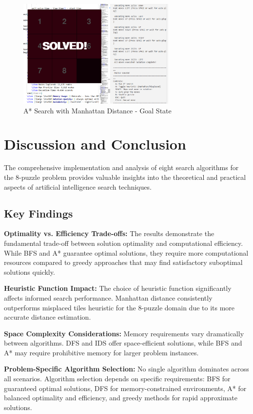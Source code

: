 \documentclass[11pt,a4paper]{article}
\begin{document}
\begin{figure}[H]
\centering
\includegraphics[width=0.7\textwidth]{../searches/astar_8_puzzle/End_state_man.png}
\caption{A* Search with Manhattan Distance - Goal State}
\end{figure}

\section{Discussion and Conclusion}

The comprehensive implementation and analysis of eight search algorithms for the 8-puzzle problem provides valuable insights into the theoretical and practical aspects of artificial intelligence search techniques.

\subsection{Key Findings}

\textbf{Optimality vs. Efficiency Trade-offs:} The results demonstrate the fundamental trade-off between solution optimality and computational efficiency. While BFS and A* guarantee optimal solutions, they require more computational resources compared to greedy approaches that may find satisfactory suboptimal solutions quickly.

\textbf{Heuristic Function Impact:} The choice of heuristic function significantly affects informed search performance. Manhattan distance consistently outperforms misplaced tiles heuristic for the 8-puzzle domain due to its more accurate distance estimation.

\textbf{Space Complexity Considerations:} Memory requirements vary dramatically between algorithms. DFS and IDS offer space-efficient solutions, while BFS and A* may require prohibitive memory for larger problem instances.

\textbf{Problem-Specific Algorithm Selection:} No single algorithm dominates across all scenarios. Algorithm selection depends on specific requirements: BFS for guaranteed optimal solutions, DFS for memory-constrained environments, A* for balanced optimality and efficiency, and greedy methods for rapid approximate solutions.
\end{document}
